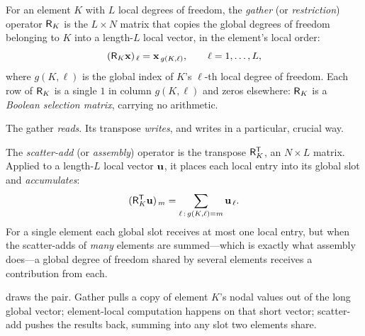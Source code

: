 \begin{definition}
For an element $K$ with $L$ local degrees of freedom, the \emph{gather} (or
\emph{restriction}) operator $\mathsf{R}_K$ is the $L\times N$ matrix that copies the
global degrees of freedom belonging to $K$ into a length-$L$ local vector, in the
element's local order:
\[
(\mathsf{R}_K\mathbf{x})_{\,\ell}=\mathbf{x}_{\,g(K,\ell)},\qquad \ell=1,\dots,L,
\]
where $g(K,\ell)$ is the global index of $K$'s $\ell$-th local degree of freedom.
Each row of $\mathsf{R}_K$ is a single $1$ in column $g(K,\ell)$ and zeros
elsewhere: $\mathsf{R}_K$ is a \emph{Boolean selection matrix}, carrying no
arithmetic.
\end{definition}

The gather \emph{reads}. Its transpose \emph{writes}, and writes in a particular,
crucial way.

\begin{definition}
The \emph{scatter-add} (or \emph{assembly}) operator is the transpose
$\mathsf{R}_K^{\mathsf T}$, an $N\times L$ matrix. Applied to a length-$L$ local
vector $\mathbf{u}$, it places each local entry into its global slot and
\emph{accumulates}:
\[
(\mathsf{R}_K^{\mathsf T}\mathbf{u})_{\,m}=\sum_{\ell\,:\,g(K,\ell)=m}\mathbf{u}_{\,\ell}.
\]
For a single element each global slot receives at most one local entry, but when
the scatter-adds of \emph{many} elements are summed---which is exactly what
assembly does---a global degree of freedom shared by several elements receives a
contribution from each.
\end{definition}

 draws the pair. Gather pulls a copy of element $K$'s
nodal values out of the long global vector; element-local computation happens on
that short vector; scatter-add pushes the results back, summing into any slot two
elements share.

